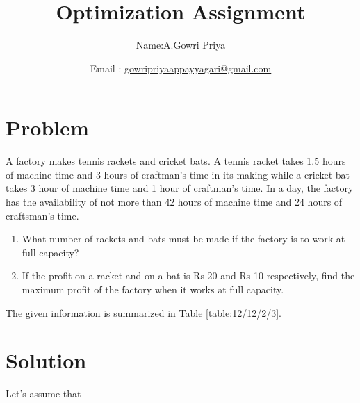 \documentclass[10pt, a4paper]{article}
\begin{document}
\title{Optimization Assignment}
\author{Name:A.Gowri Priya\and Email :  \url{gowripriyaappayyagari@gmail.com}}
\date{}
\maketitle
  \section{Problem}
  \fi
A factory makes tennis rackets and cricket bats. A tennis racket takes 1.5 hours of machine time and 3 hours of
craftman’s time in its making while a cricket bat takes 3 hour of machine time and 1 hour of craftman’s time. In a
day, the factory has the availability of not more than 42 hours of machine time and 24 hours of craftsman’s time.
\begin{enumerate}
	\item What number of rackets and bats must be made if the factory is to work at full capacity?
	\item  If the profit on a racket and on a bat is Rs 20 and Rs 10 respectively, find the maximum profit of the factory when
it works at full capacity.
\end{enumerate}
\solution
The given information is summarized in Table
		\ref{table:12/12/2/3}.
\iffalse
\section{Solution}
Let's assume that
\end{document}
